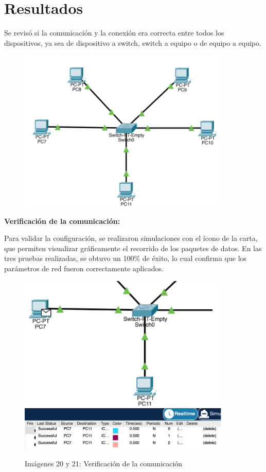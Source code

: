 \documentclass[letterpaper,12pt,oneside]{article}
\begin{document}
\section{Resultados}
Se revisó si la comunicación y la conexión era correcta entre todos los dispositivos, ya sea de dispositivo a switch, switch a equipo o de equipo a equipo.
\begin{figure}[h!]
    \centering
    \includegraphics[width=0.9\textwidth]{19.png}
\end{figure}

\textbf{Verificación de la comunicación:}

Para validar la configuración, se realizaron simulaciones con el ícono de la carta, que permiten visualizar gráficamente el recorrido de los paquetes de datos. En las tres pruebas realizadas, se obtuvo un 100\% de éxito, lo cual confirma que los parámetros de red fueron correctamente aplicados.

\begin{figure}[H]
\centering
\includegraphics[width=0.9\textwidth]{20.png}
\includegraphics[width=0.9\textwidth]{21.png}
\caption{Imágenes 20 y 21: Verificación de la comunicación}
\end{figure}
\end{document}
